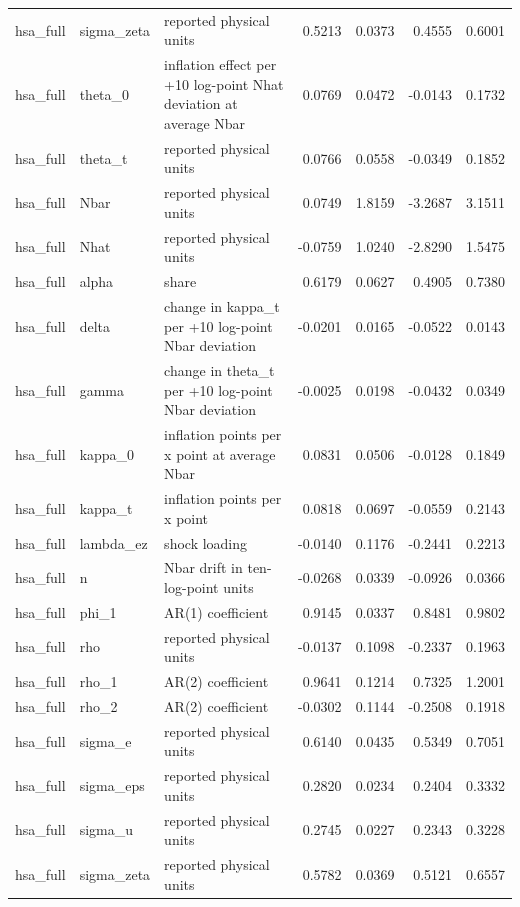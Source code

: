 \begin{tabular}{lllrrrr}
hsa\_full & sigma\_zeta & reported physical units & 0.5213 & 0.0373 & 0.4555 & 0.6001 \\
hsa\_full & theta\_0 & inflation effect per +10 log-point Nhat deviation at average Nbar & 0.0769 & 0.0472 & -0.0143 & 0.1732 \\
hsa\_full & theta\_t & reported physical units & 0.0766 & 0.0558 & -0.0349 & 0.1852 \\
hsa\_full & Nbar & reported physical units & 0.0749 & 1.8159 & -3.2687 & 3.1511 \\
hsa\_full & Nhat & reported physical units & -0.0759 & 1.0240 & -2.8290 & 1.5475 \\
hsa\_full & alpha & share & 0.6179 & 0.0627 & 0.4905 & 0.7380 \\
hsa\_full & delta & change in kappa\_t per +10 log-point Nbar deviation & -0.0201 & 0.0165 & -0.0522 & 0.0143 \\
hsa\_full & gamma & change in theta\_t per +10 log-point Nbar deviation & -0.0025 & 0.0198 & -0.0432 & 0.0349 \\
hsa\_full & kappa\_0 & inflation points per x point at average Nbar & 0.0831 & 0.0506 & -0.0128 & 0.1849 \\
hsa\_full & kappa\_t & inflation points per x point & 0.0818 & 0.0697 & -0.0559 & 0.2143 \\
hsa\_full & lambda\_ez & shock loading & -0.0140 & 0.1176 & -0.2441 & 0.2213 \\
hsa\_full & n & Nbar drift in ten-log-point units & -0.0268 & 0.0339 & -0.0926 & 0.0366 \\
hsa\_full & phi\_1 & AR(1) coefficient & 0.9145 & 0.0337 & 0.8481 & 0.9802 \\
hsa\_full & rho & reported physical units & -0.0137 & 0.1098 & -0.2337 & 0.1963 \\
hsa\_full & rho\_1 & AR(2) coefficient & 0.9641 & 0.1214 & 0.7325 & 1.2001 \\
hsa\_full & rho\_2 & AR(2) coefficient & -0.0302 & 0.1144 & -0.2508 & 0.1918 \\
hsa\_full & sigma\_e & reported physical units & 0.6140 & 0.0435 & 0.5349 & 0.7051 \\
hsa\_full & sigma\_eps & reported physical units & 0.2820 & 0.0234 & 0.2404 & 0.3332 \\
hsa\_full & sigma\_u & reported physical units & 0.2745 & 0.0227 & 0.2343 & 0.3228 \\
hsa\_full & sigma\_zeta & reported physical units & 0.5782 & 0.0369 & 0.5121 & 0.6557 \\

\end{tabular}
